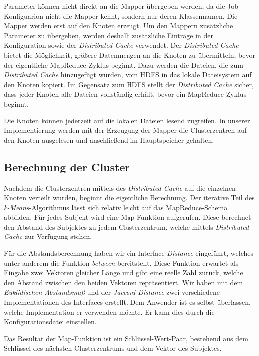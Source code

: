 \documentclass[a4paper]{llncs}
\begin{document}
Parameter können nicht direkt an die Mapper übergeben werden, da die Job-Konfiguarion nicht die Mapper kennt, sondern nur deren Klassennamen. Die Mapper werden erst auf den Knoten erzeugt. Um den Mappern zusätzliche Parameter zu übergeben, werden deshalb zusätzliche Einträge in der Konfiguration sowie der \emph{Distributed Cache} verwendet. Der \emph{Distributed Cache} bietet die Möglichkeit, größere Datenmengen an die Knoten zu übermitteln, bevor der eigentliche MapReduce-Zyklus beginnt. Dazu werden die Dateien, die zum \emph{Distributed Cache} hinzugefügt wurden, vom HDFS in das lokale Dateisystem auf den Knoten kopiert. Im Gegensatz zum HDFS stellt der \emph{Distributed Cache} sicher, dass jeder Knoten alle Dateien vollständig erhält, bevor ein MapReduce-Zyklus beginnt.

Die Knoten können jederzeit auf die lokalen Dateien lesend zugreifen. In unserer Implementierung werden mit der Erzeugung der Mapper die Clusterzentren auf den Knoten ausgelesen und anschließend im Hauptspeicher gehalten.

\subsection{Berechnung der Cluster}
\label{sec:BerechnungDerCluster}
Nachdem die Clusterzentren mittels des \emph{Distributed Cache} auf die einzelnen Knoten verteilt wurden, beginnt die eigentliche Berechnung.
Der iterative Teil des \emph{k-Means}-Algorithmus lässt sich relativ leicht auf das MapReduce-Schema abbilden. Für jedes Subjekt wird eine Map-Funktion aufgerufen. 
Diese berechnet den Abstand des Subjektes zu jedem Clusterzentrum, welche mittels \emph{Distributed Cache} zur Verfügung stehen.

Für die Abstandsberechnung haben wir ein Interface \emph{Distance} eingeführt, welches unter anderem die Funktion \emph{between} bereitstellt.
Diese Funktion erwartet als Eingabe zwei Vektoren gleicher Länge und gibt eine reelle Zahl zurück, welche den Abstand zwischen den beiden Vektoren repräsentiert.
Wir haben mit dem \emph{Euklidischen Abstandsmaß} und der \emph{Jaccard Distance} zwei verschiedene Implementationen des Interfaces erstellt.
Dem Anwender ist es selbst überlassen, welche Implementation er verwenden möchte. Er kann dies durch die Konfigurationsdatei einstellen.

Das Resultat der Map-Funktion ist ein Schlüssel-Wert-Paar, bestehend aus dem Schlüssel des nächsten Clusterzentrums und dem Vektor des Subjektes.
\end{document}
